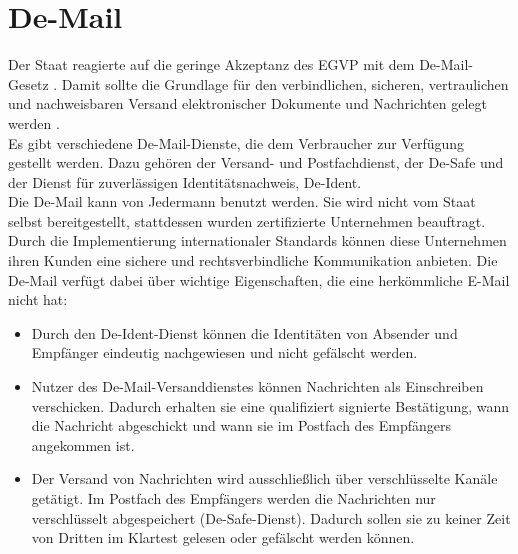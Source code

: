 \section{De-Mail}
Der Staat reagierte auf die geringe Akzeptanz des EGVP mit dem De-Mail-Gesetz \cite{bea:demailgesetz}. Damit sollte die Grundlage für den verbindlichen, sicheren, vertraulichen und nachweisbaren Versand elektronischer Dokumente und Nachrichten gelegt werden \cite{bea:demail}.  \\
Es gibt verschiedene De-Mail-Dienste, die dem Verbraucher zur Verfügung gestellt werden. Dazu gehören der Versand- und Postfachdienst, der De-Safe und der Dienst für zuverlässigen Identitätsnachweis, De-Ident. \\
Die De-Mail kann von Jedermann benutzt werden. Sie wird nicht vom Staat selbst bereitgestellt, stattdessen wurden zertifizierte Unternehmen beauftragt. Durch die Implementierung internationaler Standards können diese Unternehmen ihren Kunden eine sichere und rechtsverbindliche Kommunikation anbieten. Die De-Mail verfügt dabei über wichtige Eigenschaften, die eine herkömmliche E-Mail nicht hat:
\begin{itemize}
	\item Durch den De-Ident-Dienst können die Identitäten von Absender und Empfänger eindeutig nachgewiesen und nicht gefälscht werden. 
	\item Nutzer des De-Mail-Versanddienstes können Nachrichten als Einschreiben verschicken. Dadurch erhalten sie eine qualifiziert signierte Bestätigung, wann die Nachricht abgeschickt und wann sie im Postfach des Empfängers angekommen ist.
	\item Der Versand von Nachrichten wird ausschließlich über verschlüsselte Kanäle getätigt. Im Postfach des Empfängers werden die Nachrichten nur verschlüsselt abgespeichert (De-Safe-Dienst). Dadurch sollen sie zu keiner Zeit von Dritten im Klartest gelesen oder gefälscht werden können.
\end{itemize}

